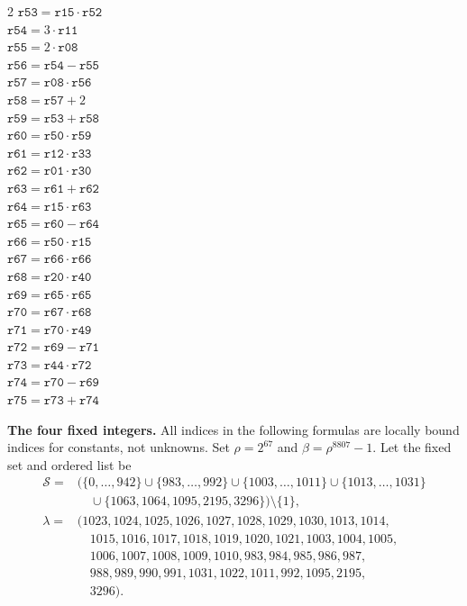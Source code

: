 \documentclass[10pt]{article}
\begin{document}
\begin{multicols}{2}
\(\mathtt{r53} = \mathtt{r15} \cdot \mathtt{r52}\)\\
\(\mathtt{r54} = 3 \cdot \mathtt{r11}\)\\
\(\mathtt{r55} = 2 \cdot \mathtt{r08}\)\\
\(\mathtt{r56} = \mathtt{r54} - \mathtt{r55}\)\\
\(\mathtt{r57} = \mathtt{r08} \cdot \mathtt{r56}\)\\
\(\mathtt{r58} = \mathtt{r57} + 2\)\\
\(\mathtt{r59} = \mathtt{r53} + \mathtt{r58}\)\\
\(\mathtt{r60} = \mathtt{r50} \cdot \mathtt{r59}\)\\
\(\mathtt{r61} = \mathtt{r12} \cdot \mathtt{r33}\)\\
\(\mathtt{r62} = \mathtt{r01} \cdot \mathtt{r30}\)\\
\(\mathtt{r63} = \mathtt{r61} + \mathtt{r62}\)\\
\(\mathtt{r64} = \mathtt{r15} \cdot \mathtt{r63}\)\\
\(\mathtt{r65} = \mathtt{r60} - \mathtt{r64}\)\\
\(\mathtt{r66} = \mathtt{r50} \cdot \mathtt{r15}\)\\
\(\mathtt{r67} = \mathtt{r66} \cdot \mathtt{r66}\)\\
\(\mathtt{r68} = \mathtt{r20} \cdot \mathtt{r40}\)\\
\(\mathtt{r69} = \mathtt{r65} \cdot \mathtt{r65}\)\\
\(\mathtt{r70} = \mathtt{r67} \cdot \mathtt{r68}\)\\
\(\mathtt{r71} = \mathtt{r70} \cdot \mathtt{r49}\)\\
\(\mathtt{r72} = \mathtt{r69} - \mathtt{r71}\)\\
\(\mathtt{r73} = \mathtt{r44} \cdot \mathtt{r72}\)\\
\(\mathtt{r74} = \mathtt{r70} - \mathtt{r69}\)\\
\(\mathtt{r75} = \mathtt{r73} + \mathtt{r74}\)\\
\end{multicols}
\clearpage
\textbf{The four fixed integers.} All indices in the following formulas are
locally bound indices for constants, not unknowns. Set \(\rho=2^{67}\) and
\(\beta=\rho^{8807}-1\). Let the fixed set and ordered list be
\[
\begin{aligned}
\mathcal S={}&\bigl(\{0,\ldots,942\}\cup\{983,\ldots,992\}\cup
\{1003,\ldots,1011\}\cup\{1013,\ldots,1031\}\\
&\quad\cup\{1063,1064,1095,2195,3296\}\bigr)\setminus\{1\},\\
\lambda={}&(1023,1024,1025,1026,1027,1028,1029,1030,1013,1014,\\
&\quad 1015,1016,1017,1018,1019,1020,1021,1003,1004,1005,\\
&\quad 1006,1007,1008,1009,1010,983,984,985,986,987,\\
&\quad 988,989,990,991,1031,1022,1011,992,1095,2195,\\
&\quad 3296).
\end{aligned}
\]
\end{document}
